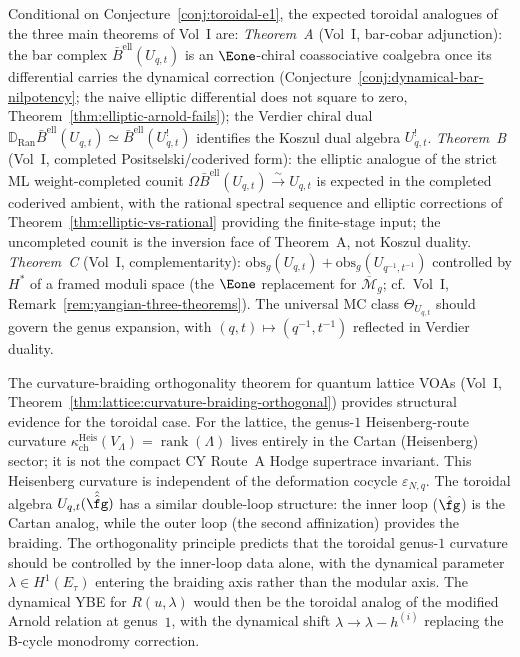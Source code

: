 \begin{remark}
\label{rem:toroidal-three-theorems}
Conditional on Conjecture~\ref{conj:toroidal-e1}, the expected toroidal analogues of the three main theorems of Vol~I are:
\emph{Theorem~A} (Vol~I, bar-cobar adjunction): the bar complex $\bar{B}^{\mathrm{ell}}(U_{q,t})$ is an $\Eone$-chiral coassociative coalgebra once its differential carries the dynamical correction (Conjecture~\ref{conj:dynamical-bar-nilpotency}; the naive elliptic differential does not square to zero, Theorem~\ref{thm:elliptic-arnold-fails}); the Verdier chiral dual $\mathbb{D}_{\mathrm{Ran}}\bar{B}^{\mathrm{ell}}(U_{q,t}) \simeq \bar{B}^{\mathrm{ell}}(U_{q,t}^{!})$ identifies the Koszul dual algebra $U_{q,t}^{!}$.
\emph{Theorem~B} (Vol~I, completed Positselski/coderived form): the
elliptic analogue of the strict ML weight-completed counit
$\Omega\bar{B}^{\mathrm{ell}}(U_{q,t}) \xrightarrow{\sim} U_{q,t}$
is expected in the completed coderived ambient, with the rational
spectral sequence and elliptic corrections of
Theorem~\ref{thm:elliptic-vs-rational} providing the finite-stage
input; the uncompleted counit is the inversion face of Theorem~A, not
Koszul duality.
\emph{Theorem~C} (Vol~I, complementarity): $\mathrm{obs}_g(U_{q,t}) + \mathrm{obs}_g(U_{q^{-1},t^{-1}})$ controlled by $H^*$ of a framed moduli space (the $\Eone$ replacement for $\overline{\mathcal{M}}_g$; cf.\ Vol~I, Remark~\ref{rem:yangian-three-theorems}).
The universal MC class $\Theta_{U_{q,t}}$ should govern the genus expansion, with $(q,t) \mapsto (q^{-1},t^{-1})$ reflected in Verdier duality.
\end{remark}

\begin{remark}
\label{rem:toroidal-lattice-evidence}
The curvature-braiding orthogonality theorem for quantum lattice VOAs
(Vol~I, Theorem~\ref{thm:lattice:curvature-braiding-orthogonal}) provides
structural evidence for the toroidal case. For the lattice, the genus-$1$
Heisenberg-route curvature
$\kappa_{\mathrm{ch}}^{\mathrm{Heis}}(V_\Lambda)
= \operatorname{rank}(\Lambda)$ lives entirely in the
Cartan (Heisenberg) sector; it is not the compact CY Route~A Hodge
supertrace invariant. This Heisenberg curvature is independent of the deformation cocycle
$\varepsilon_{N,q}$. The toroidal algebra $U_{q,t}(\hat{\hat{\fg}})$
has a similar double-loop structure: the inner loop ($\hat{\fg}$) is the
Cartan analog, while the outer loop (the second affinization) provides
the braiding. The orthogonality principle predicts that the toroidal
genus-$1$ curvature should be controlled by the inner-loop data alone,
with the dynamical parameter $\lambda \in H^1(E_\tau)$ entering the
braiding axis rather than the modular axis. The dynamical YBE for
$R(u, \lambda)$ would then be the toroidal analog of the modified
Arnold relation at genus~$1$, with the dynamical shift
$\lambda \to \lambda - h^{(i)}$ replacing the B-cycle monodromy
correction.
\end{remark}


